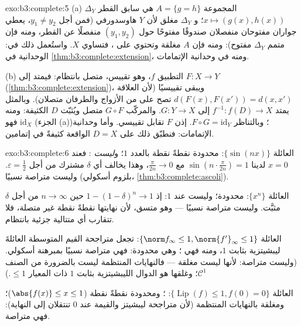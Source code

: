 \begin{solution}{exo:b3:complete:5}
(a) المجموعة $A = \{g = h\}$ هي سابق القطر $\Delta_Y$  $x \mapsto (g(x), h(x))$؛ و $\Delta_Y$ مغلق لأن $Y$ هاوسدورفي (فمن أجل
$y_1 \neq y_2$، يعطي جواران مفتوحان منفصلان صندوقًا مفتوحًا حول
$(y_1,
y_2)$ منفصلًا عن القطر، ومنه فإن متمم $\Delta_Y$ مفتوح): ومنه
فإن $A$ مغلقة وتحتوي على ، فتساوي $X$. واستُعمل
ذلك في: الوحدانية في \cref{thm:b3:complete:extension}، ومنه في وحدانية الإتمامات.

(b) التطبيق $f$، وهو تقييس، متصل بانتظام: فيمتد إلى $F\colon X \to Y$
(\cref{thm:b3:complete:extension})، ويبقى تقييسيًا (لأن العلاقة $d(F(x), F(x')) = d(x, x')$ تصح على  من الأزواج والطرفان متصلان). وبالمثل يمتد $f^{-1}\colon f(D) \to X$ إلى
$G \colon Y \to X$. والمركّب $G \circ F$ متصل ويُثبّت $D$ الكثيفة: ومنه فهو
$\mathrm{id}_X$ (الجزء (a))؛ وبالتناظر $F \circ G =
\mathrm{id}_Y$. إذن $F$ تقابل
تقييسي. وأما وحدانية الإتمامات: فنطبّق ذلك على $D = X$ الواقعة
كثيفةً في إتمامين.
\end{solution}

\begin{solution}{exo:b3:complete:6}
العائلة $\{\sin(nx)\}$: محدودة نقطةً نقطة بالعدد $1$؛
و\emph{ليست} : فعند $x = 0$ لدينا $\sin(n\cdot\frac{\pi}{2n}) = 1$ مع
$\frac\pi{2n} \to 0$، وهذا يخالف أي $\delta$ مشترك من أجل $\varepsilon = \frac12$. وليست
متراصة نسبيًا (بلزوم أسكولي، \cref{thm:b3:complete:ascoli}).

العائلة $\{x^n\}$: محدودة؛ وليست  عند $1$: إذ
$1 - (1 -
\delta)^n \to 1$ حين $n \to \infty$ من أجل $\delta$ مثبَّت. وليست متراصة
نسبيًا --- وهو متسق، لأن نهايتها نقطةً نقطة غير متصلة، فلا
تتقارب أي متتالية جزئية بانتظام.

العائلة $\{\norm f_\infty \leq 1, \norm{f'}_\infty \leq 1\}$: تجعل متراجحة القيم المتوسطة العائلةَ ليبشيتزية
بثابت $1$، ومنه فهي ؛ وهي محدودة: فهي متراصة
نسبيًا بمبرهنة أسكولي. (وليست متراصة: لأنها ليست مغلقة ---
فالنهايات المنتظمة ليست بالضرورة من الصنف $\mathcal C^1$؛ وغلقها
هو الدوال الليبشيتزية بثابت $1$ ذات المعيار $\leq 1$.)

العائلة $\{\operatorname{Lip}(f) \leq 1, f(0) = 0\}$: ؛ ومحدودة نقطةً نقطة ($\abs{f(x)} \leq x \leq 1$)؛
ومغلقة بالنهايات المنتظمة (لأن متراجحة ليبشيتز والقيمة عند $0$
تنتقلان إلى النهاية): فهي متراصة.
\end{solution}

